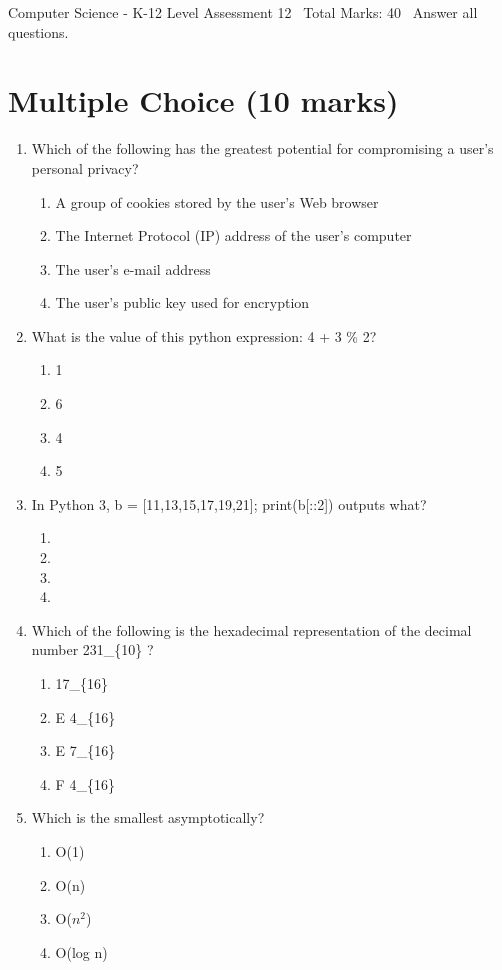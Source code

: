\documentclass[12pt]{article}
\begin{document}
\begin{center}
Computer Science - K-12 Level Assessment 12 \
Total Marks: 40 \
Answer all questions.
\end{center}

\section*{Multiple Choice (10 marks)}
\begin{enumerate}[label=\arabic*.]
\item Which of the following has the greatest potential for compromising a user's personal privacy?
\begin{enumerate}[label=(\alph*)]
    \item A group of cookies stored by the user's Web browser
    \item The Internet Protocol (IP) address of the user's computer
    \item The user's e-mail address
    \item The user's public key used for encryption
\end{enumerate}
\item What is the value of this python expression: 4 + 3 \% 2?
\begin{enumerate}[label=(\alph*)]
    \item 1
    \item 6
    \item 4
    \item 5
\end{enumerate}
\item In Python 3, b = [11,13,15,17,19,21]; print(b[::2]) outputs what?
\begin{enumerate}[label=(\alph*)]
    \item [19,21]
    \item [11,15]
    \item [11,15,19]
    \item [13,17,21]
\end{enumerate}
\item Which of the following is the hexadecimal representation of the decimal number 231\_\{10\} ?
\begin{enumerate}[label=(\alph*)]
    \item 17\_\{16\}
    \item E 4\_\{16\}
    \item E 7\_\{16\}
    \item F 4\_\{16\}
\end{enumerate}
\item Which is the smallest asymptotically?
\begin{enumerate}[label=(\alph*)]
    \item O(1)
    \item O(n)
    \item O($n^2$)
    \item O(log n)
\end{enumerate}
\end{enumerate}
\end{document}
